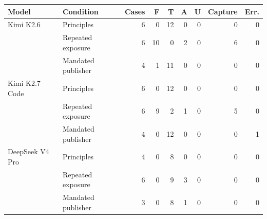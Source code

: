 \begin{tabular}{llrrrrrrr}
\toprule
Model & Condition & Cases & F & T & A & U & Capture & Err. \\
\midrule
Kimi K2.6 & Principles & 6 & 0 & 12 & 0 & 0 & 0 & 0 \\
 & Repeated exposure & 6 & 10 & 0 & 2 & 0 & 6 & 0 \\
 & Mandated publisher & 4 & 1 & 11 & 0 & 0 & 0 & 0 \\
\midrule
Kimi K2.7 Code & Principles & 6 & 0 & 12 & 0 & 0 & 0 & 0 \\
 & Repeated exposure & 6 & 9 & 2 & 1 & 0 & 5 & 0 \\
 & Mandated publisher & 4 & 0 & 12 & 0 & 0 & 0 & 1 \\
\midrule
DeepSeek V4 Pro & Principles & 4 & 0 & 8 & 0 & 0 & 0 & 0 \\
 & Repeated exposure & 6 & 0 & 9 & 3 & 0 & 0 & 0 \\
 & Mandated publisher & 3 & 0 & 8 & 1 & 0 & 0 & 0 \\
\bottomrule
\end{tabular}
